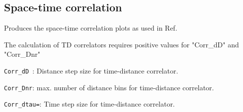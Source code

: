 \subsection{Space-time correlation}

Produces the space-time correlation plots as used in Ref.~\cite{Wang:2023}

The calculation of TD correlators requires positive values for "Corr\_dD" and "Corr\_Dnr"
\begin{enumerate*}
\item \verb!Corr_dD !: Distance step size for time-distance correlator.
\item \verb!Corr_Dnr!: max. number of distance bins for time-distance correlator.
\item \verb!Corr_dtau=!: Time step size for time-distance correlator.
\end{enumerate*}


\clearpage 